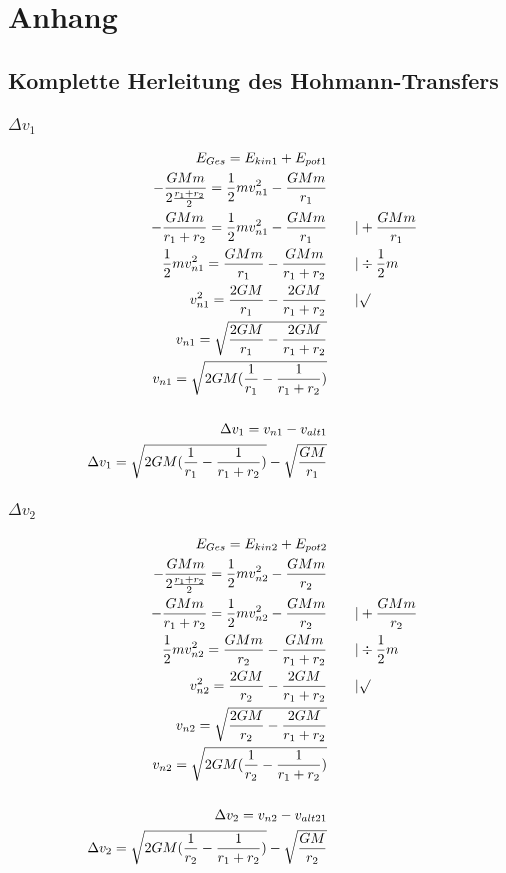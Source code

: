 \documentclass[12pt,a4paper]{article}
\begin{document}
\section{Anhang}
\subsection{Komplette Herleitung des Hohmann-Transfers}
\subsubsection{$ \Delta v_1$}
\[
\begin{aligned} 
E_{Ges} = E_{kin1} + E_{pot1}\\
-\frac{GMm}{2\frac{r_1+r_2}{2} } = \frac{1}{2}mv^2_{n1} - \frac{GMm}{r_1}\\
-\frac{GMm}{r_1+r_2}= \frac{1}{2} mv^2_{n1} - \frac{GMm}{r_1} & \qquad| + \frac{GMm}{r_1}\\
\frac{1}{2} mv^2_{n1} = \frac{GMm}{r_1} -\frac{GMm}{r_1+r_2} & \qquad| \div \frac{1}{2}m\\
v^2_{n1} = \frac{2GM}{r_1} - \frac{2GM}{r_1+r_2} & \qquad|\surd \\
v_{n1} = \sqrt{\frac{2GM}{r_1} - \frac{2GM}{r_1+r_2}}\\
v_{n1} = \sqrt{2GM(\frac{1}{r_1} - \frac{1}{r_1+r_2}) }\\
\\
\Delta v_1 = v_{n1} - v_{alt1}\\
\Delta v_1 = \sqrt{2GM(\frac{1}{r_1} - \frac{1}{r_1+r_2})} - \sqrt{\frac{GM}{r_1}} 
\end{aligned} \]
\subsubsection{$ \Delta v_2$}
\[\begin{aligned} 
E_{Ges} = E_{kin2} + E_{pot2}\\
-\frac{GMm}{2\frac{r_1+r_2}{2} } = \frac{1}{2}mv^2_{n2} - \frac{GMm}{r_2}\\
-\frac{GMm}{r_1+r_2}= \frac{1}{2} mv^2_{n2} - \frac{GMm}{r_2} & \qquad | + \frac{GMm}{r_2}\\
\frac{1}{2} mv^2_{n2} = \frac{GMm}{r_2} -\frac{GMm}{r_1+r_2} & \qquad | \div \frac{1}{2}m\\
v^2_{n2} = \frac{2GM}{r_2} - \frac{2GM}{r_1+r_2} & \qquad|\surd \\
v_{n2} = \sqrt{\frac{2GM}{r_2} - \frac{2GM}{r_1+r_2}}\\
v_{n2} = \sqrt{2GM(\frac{1}{r_2} - \frac{1}{r_1+r_2}) }\\
\\
\Delta v_2 = v_{n2} - v_{alt21}\\
\Delta v_2 = \sqrt{2GM(\frac{1}{r_2} - \frac{1}{r_1+r_2})} - \sqrt{\frac{GM}{r_2}} 
\end{aligned} \]
\newpage
\end{document}
